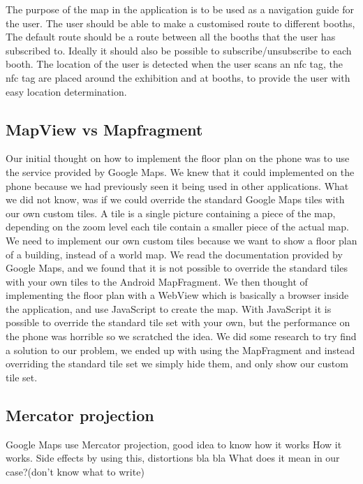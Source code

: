 The purpose of the map in the application is to be used as a navigation guide for the user. The user should be able to make a customised route to different booths, The default route should be a route between all the booths that the user has subscribed to.
Ideally it should also be possible to subscribe/unsubscribe to each booth. The location of the user is detected when the user scans an \ac{nfc} tag, the \ac{nfc} tag are placed around the exhibition and at booths, to provide the user with easy location determination.

\subsection*{MapView vs Mapfragment}
Our initial thought on how to implement the floor plan on the phone was to use the service provided by Google Maps. We knew that it could implemented on the phone because we had previously seen it being used in other applications. What we did not know, was if we could override the standard Google Maps tiles with our own custom tiles. A tile is a single picture containing a piece of the map, depending on the zoom level each tile contain a smaller piece of the actual map.\\
We need to implement our own custom tiles because we want to show a floor plan of a building, instead of a world map. We read the documentation provided by Google Maps, and we found that it is not possible to override the standard tiles with your own tiles to the Android MapFragment. We then thought of implementing the floor plan with a WebView which is basically a browser inside the application, and use JavaScript to create the map. With JavaScript it is possible to override the standard tile set with your own, but the performance on the phone was horrible so we scratched the idea.
We did some research to try find a solution to our problem, we ended up with using the MapFragment and instead overriding the standard tile set we simply hide them, and only show our custom tile set.

\subsection*{Mercator projection}
Google Maps use Mercator projection, good idea to know how it works
How it works.
Side effects by using this, distortions bla bla
What does it mean in our case?(don't know what to write)

